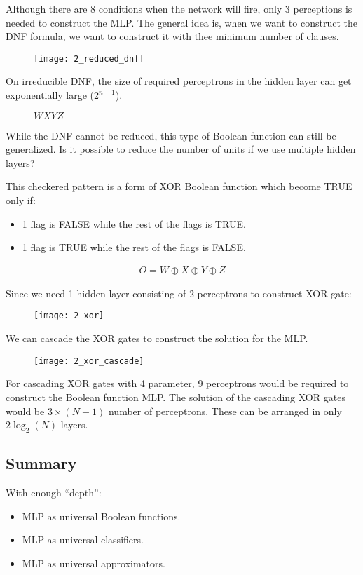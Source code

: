 \hfill\break
Although there are 8 conditions when the network will fire, only 3 perceptions is needed to construct the MLP. The general idea is, when we want to construct the DNF formula, we want to construct it with thee minimum number of clauses.

\begin{figure}[H]
	\centering
	\texttt{[image: 2\_reduced\_dnf]}
\end{figure}

\hfill\break
On irreducible DNF, the size of required perceptrons in the hidden layer can get exponentially large ($2^{n-1}$).

\begin{figure}[H]
	\centering
	\begin{Karnaugh}{$WX$}{$YZ$}
	\end{Karnaugh}
\end{figure}

\hfill\break
While the DNF cannot be reduced, this type of Boolean function can still be generalized. Is it possible to reduce the number of units if we use multiple hidden layers?

This checkered pattern is a form of XOR Boolean function which become TRUE only if:
\begin{itemize}
	\item 1 flag is FALSE while the rest of the flags is TRUE.
	\item 1 flag is TRUE while the rest of the flags is FALSE.
\end{itemize}

\begin{align}
	O = W \oplus X \oplus Y \oplus Z
\end{align}

\hfill\break
Since we need 1 hidden layer consisting of 2 perceptrons to construct XOR gate:

\begin{figure}[H]
	\centering
	\texttt{[image: 2\_xor]}
\end{figure}

\hfill\break
We can cascade the XOR gates to construct the solution for the MLP.

\begin{figure}[H]
	\centering
	\texttt{[image: 2\_xor\_cascade]}
\end{figure}

\hfill\break
For cascading XOR gates with 4 parameter, 9 perceptrons would be required to construct the Boolean function MLP. The solution of the cascading XOR gates would be $3\times (N-1)$ number of perceptrons. These can be arranged in only $2\log_2(N)$ layers.

\subsection{Summary}
With enough ``depth'':
\begin{itemize}
	\item MLP as universal Boolean functions.
	\item MLP as universal classifiers.
	\item MLP as universal approximators.
\end{itemize}
